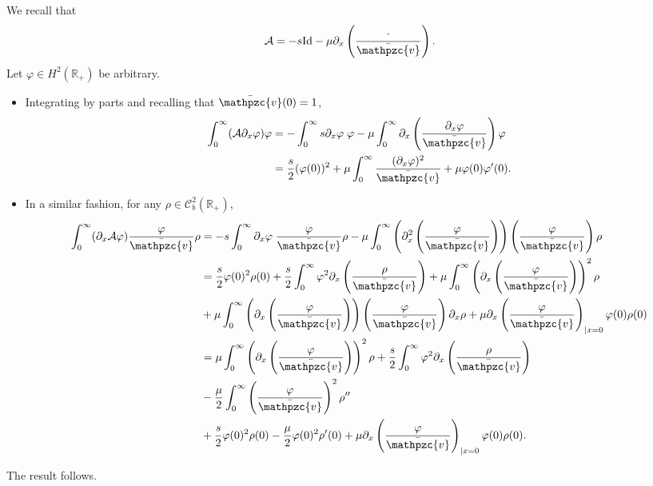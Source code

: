 \documentclass[AHL,Unicode,longabstracts,published]{cedram}
\newcommand{\R}{\mathbb{R}}
\newcommand{\p}{\partial}
\newcommand{\bv}{\bar{\mathpzc{v}}}
\newcommand{\cA}{\mathcal A}
\newcommand{\cC}{\mathcal C}
\newcommand{\rId}{\mathrm{Id}}
\begin{document}
We recall that
\[
\cA=-s\rId - \mu \p_x \left(\frac{\cdot}{\bv}\right).
\]
Let $\varphi \in H^2(\R_+)$ be arbitrary.
\begin{itemize}
\item Integrating by parts and recalling that $\bv(0)=1$,
\begin{align*}
\int_0^\infty (\cA \p_x \varphi) \varphi&= - \int_0^\infty s\p_x \varphi\; \varphi - \mu \int_0^\infty\p_x \left(\frac{\p_x \varphi}{\bv}\right)\varphi\\
&=\frac{s}{2} (\varphi(0))^2 + \mu \int_0^\infty \frac{(\p_x \varphi)^2}{\bv} + \mu \varphi(0) \varphi'(0).
\end{align*}

\item In a similar fashion, for any $\rho\in \cC_b^2(\R_+)$,
\begin{align*}
\int_0^\infty (\p_x\cA \varphi) \frac{\varphi}{\bv} \rho &= -s\int_0^\infty \p_x \varphi \; \frac{\varphi}{\bv} \rho - \mu \int_0^\infty \left(\p_x^2\left(\frac{\varphi}{\bv}\right)\right) \left(\frac{\varphi}{\bv}\right) \rho\\
&= \frac{s}{2} \varphi(0)^2 \rho(0) + \frac{s}{2} \int_0^\infty \varphi^2 \p_x \left(\frac{\rho}{\bv}\right) + \mu \int_0^\infty \left(\p_x\left(\frac{\varphi}{\bv}\right)\right)^2 \rho\\
& + \mu \int_0^\infty \left(\p_x\left(\frac{\varphi}{\bv}\right)\right)\left(\frac{\varphi}{\bv}\right) \p_x \rho + \mu \p_x \left(\frac{\varphi}{\bv}\right)_{|x=0} \varphi(0)\rho(0)\\
&= \mu \int_0^\infty \left(\p_x\left(\frac{\varphi}{\bv}\right)\right)^2 \rho + \frac{s}{2} \int_0^\infty \varphi^2 \p_x \left(\frac{\rho}{\bv}\right)\\
&- \frac{\mu}{2}\int_0^\infty \left(\frac{\varphi}{\bv}\right)^2 \rho''\\
& +\frac{s}{2} \varphi(0)^2 \rho(0) - \frac{\mu}{2}\varphi(0)^2 \rho'(0) + \mu \p_x \left(\frac{\varphi}{\bv}\right)_{|x=0} \varphi(0)\rho(0).
\end{align*}
\end{itemize}
The result follows.

\vspace*{20pt}



\vspace*{10pt}
\end{document}

